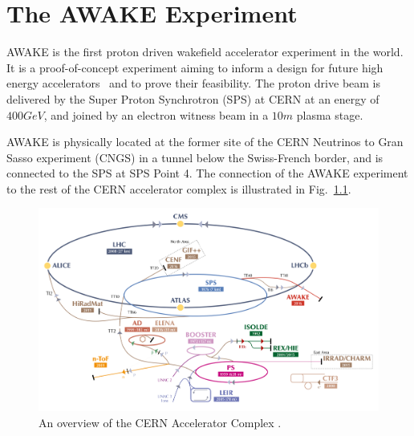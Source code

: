 %
%

\chapter{The AWAKE Experiment}
\label{Ch:WFA}

AWAKE is the first proton driven wakefield accelerator experiment in the world. It is a proof-of-concept experiment aiming to inform a design for future high energy accelerators~\cite{gschwendtner:2016} and to prove their feasibility.
The proton drive beam is delivered by the Super Proton Synchrotron (SPS) at CERN at an energy of $400\unit{GeV}$, and joined by an electron witness beam in a $10\unit{m}$ plasma stage.

AWAKE is physically located at the former site of the CERN Neutrinos to Gran Sasso experiment (CNGS) \cite{gschwendtner:2010} in a tunnel below the Swiss-French border, and is connected to the SPS at SPS Point 4.
The connection of the AWAKE experiment to the rest of the CERN accelerator complex is illustrated in Fig.~\ref{Fig:WFA:AccComp}.

\begin{figure}[hbt]
    \centering
    \includegraphics[width=0.99\linewidth,trim={20mm 0mm 20mm 0mm},clip]{figures/AcceleratorComplex}
    \caption{\label{Fig:WFA:AccComp}
        An overview of the CERN Accelerator Complex \cite{add:mobs:2016}.
    }
\end{figure}


